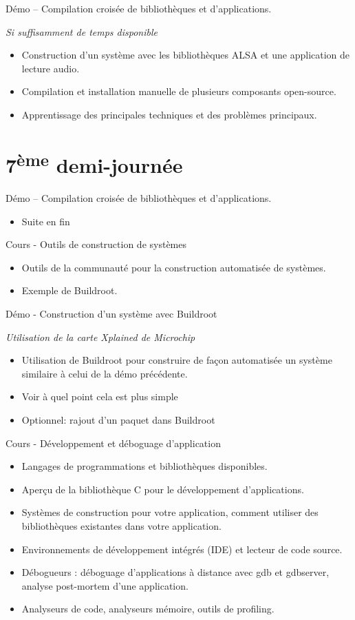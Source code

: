 \documentclass[a4paper,12pt,obeyspaces,spaces,hyphens]{article}
\begin{document}
\feagendaonecolumn
{Démo – Compilation croisée de bibliothèques et d'applications.}
{
  {\em Si suffisamment de temps disponible}
  \begin{itemize}
  \item Construction d'un système avec les bibliothèques ALSA et une
	application de lecture audio.
  \item Compilation et installation manuelle de plusieurs
	composants open-source.
  \item Apprentissage des principales techniques et des problèmes principaux.
  \end{itemize}
}

\section{7\textsuperscript{ème} demi-journée}

\feagendaonecolumn
{Démo – Compilation croisée de bibliothèques et d'applications.}
{
  \begin{itemize}
  \item Suite en fin
  \end{itemize}
}

\feagendatwocolumn
{Cours - Outils de construction de systèmes}
{
  \begin{itemize}
  \item Outils de la communauté pour la construction
	automatisée de systèmes.
  \item Exemple de Buildroot.
  \end{itemize}
}
{Démo - Construction d'un système avec Buildroot}
{
  {\em Utilisation de la carte Xplained de Microchip}
  \begin{itemize}
  \item Utilisation de Buildroot pour construire de façon automatisée
	un système similaire à celui de la démo précédente.
  \item Voir à quel point cela est plus simple
  \item Optionnel: rajout d'un paquet dans Buildroot
  \end{itemize}
}

\feagendaonecolumn
{Cours - Développement et déboguage d'application}
{
  \begin{itemize}
  \item Langages de programmations et bibliothèques disponibles.
  \item Aperçu de la bibliothèque C pour le développement d'applications.
  \item Systèmes de construction pour votre application, comment utiliser des
	bibliothèques existantes dans votre application.
  \item Environnements de développement intégrés (IDE) et lecteur de code source.
  \item Débogueurs : déboguage d'applications à distance avec gdb et gdbserver, analyse
	post-mortem d'une application.
  \item Analyseurs de code, analyseurs mémoire, outils de profiling.
  \end{itemize}
}
\end{document}
